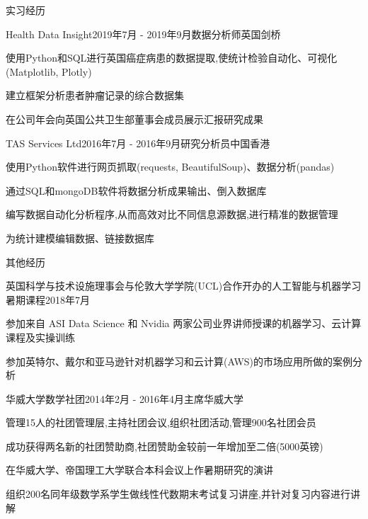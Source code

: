 \documentclass{zhresume} %
\begin{document}
\begin{rSection}{实习经历}

\begin{rSubsection}{Health Data Insight}{2019年7月 - 2019年9月}{数据分析师}{英国剑桥}
\item 使用Python和SQL进行英国癌症病患的数据提取,使统计检验自动化、可视化(Matplotlib, Plotly)
\item 建立框架分析患者肿瘤记录的综合数据集
\item 在公司年会向英国公共卫生部董事会成员展示汇报研究成果
\end{rSubsection}


\begin{rSubsection}{TAS Services Ltd}{2016年7月 - 2016年9月}{研究分析员}{中国香港}
\item 使用Python软件进行网页抓取(requests, BeautifulSoup)、数据分析(pandas)
\item 通过SQL和mongoDB软件将数据分析成果输出、倒入数据库
\item 编写数据自动化分析程序,从而高效对比不同信息源数据,进行精准的数据管理
\item 为统计建模编辑数据、链接数据库
\end{rSubsection}

\end{rSection}


\begin{rSection}{其他经历}

\begin{rSubsection}{英国科学与技术设施理事会与伦敦大学学院(UCL)合作开办的人工智能与机器学习暑期课程}{2018年7月}{}{}
	\item 参加来自 ASI Data Science 和 Nvidia 两家公司业界讲师授课的机器学习、云计算课程及实操训练
	\item 参加英特尔、戴尔和亚马逊针对机器学习和云计算(AWS)的市场应用所做的案例分析
\end{rSubsection}

\begin{rSubsection}{华威大学数学社团}{2014年2月 - 2016年4月}{主席}{华威大学}
\item 管理15人的社团管理层,主持社团会议,组织社团活动,管理900名社团会员
\item 成功获得两名新的社团赞助商,社团赞助金较前一年增加至二倍(5000英镑)
\item 在华威大学、帝国理工大学联合本科会议上作暑期研究的演讲
\item 组织200名同年级数学系学生做线性代数期末考试复习讲座,并针对复习内容进行讲解
\end{rSubsection}

\end{rSection}
\end{document}
